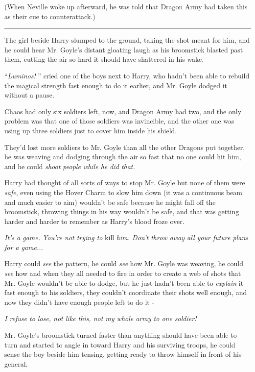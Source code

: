 (When Neville woke up afterward, he was told that Dragon Army had taken
this as their cue to counterattack.)

\begin{center}\rule{3in}{0.4pt}\end{center}

The girl beside Harry slumped to the ground, taking the shot meant for
him, and he could hear Mr. Goyle's distant gloating laugh as his
broomstick blasted past them, cutting the air so hard it should have
shattered in his wake.

``\emph{Luminos!} '' cried one of the boys next to Harry, who hadn't been
able to rebuild the magical strength fast enough to do it earlier, and
Mr. Goyle dodged it without a pause.

Chaos had only six soldiers left, now, and Dragon Army had two, and the
only problem was that one of those soldiers was invincible, and the
other one was using up three soldiers just to cover him inside his
shield.

They'd lost more soldiers to Mr. Goyle than all the other Dragons put
together, he was weaving and dodging through the air so fast that no one
could hit him, and he could \emph{shoot people while he did that.}

Harry had thought of all sorts of ways to stop Mr. Goyle but none of
them were \emph{safe}, even using the Hover Charm to slow him down (it
was a continuous beam and much easier to aim) wouldn't be safe because
he might fall off the broomstick, throwing things in his way wouldn't be
safe, and that was getting harder and harder to remember as Harry's
blood froze over.

\emph{It's a game. You're not trying to} kill \emph{him. Don't throw
away all your future plans for a game...}

Harry could \emph{see} the pattern, he could \emph{see} how Mr. Goyle
was weaving, he could \emph{see} how and when they all needed to fire in
order to create a web of shots that Mr. Goyle wouldn't be able to dodge,
but he just hadn't been able to \emph{explain} it fast enough to his
soldiers, they couldn't coordinate their shots well enough, and now they
didn't have enough people left to do it -

\emph{I refuse to lose, not like this, not my whole army to one
soldier!}

Mr. Goyle's broomstick turned faster than anything should have been able
to turn and started to angle in toward Harry and his surviving troops,
he could sense the boy beside him tensing, getting ready to throw
himself in front of his general.

